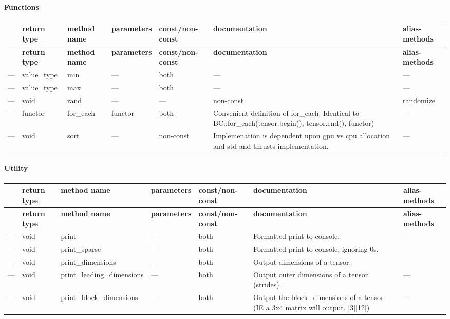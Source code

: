 \paragraph*{Functions}

\tabulinesep=1mm
\begin{longtabu} spread 0pt [c]{*7{|X[-1]}|}
\hline
{}&{\bf return type }&{\bf method name }&{\bf parameters }&{\bf const/non-\/const }&{\bf documentation }&{\bf alias-\/methods  }\\
\endfirsthead
\hline
\endfoot
\hline
{}&{\bf return type }&{\bf method name }&{\bf parameters }&{\bf const/non-\/const }&{\bf documentation }&{\bf alias-\/methods  }\\
\endhead
--- &value\+\_\+type &min &--- &both &--- &--- \\
--- &value\+\_\+type &max &--- &both &--- &--- \\
--- &void &rand &--- &--- &non-\/const &randomize \\
--- &functor &for\+\_\+each &functor &both &Convenient-\/definition of for\+\_\+each. Identical to B\+C\+::for\+\_\+each(tensor.\+begin(), tensor.\+end(), functor) &--- \\
--- &void &sort &--- &non-\/const &Implemenation is dependent upon gpu vs cpu allocation and std and thrust\textquotesingle{}s implementation. &--- \\
\end{longtabu}


\paragraph*{Utility}

\tabulinesep=1mm
\begin{longtabu} spread 0pt [c]{*7{|X[-1]}|}
\hline
{}&{\bf return type }&{\bf method name }&{\bf parameters }&{\bf const/non-\/const }&{\bf documentation }&{\bf alias-\/methods  }\\
\endfirsthead
\hline
\endfoot
\hline
{}&{\bf return type }&{\bf method name }&{\bf parameters }&{\bf const/non-\/const }&{\bf documentation }&{\bf alias-\/methods  }\\
\endhead
--- &void &print &--- &both &Formatted print to console. &--- \\
--- &void &print\+\_\+sparse &--- &both &Formatted print to console, ignoring 0\textquotesingle{}s. &--- \\
--- &void &print\+\_\+dimensions &--- &both &Output dimensions of a tensor. &--- \\
--- &void &print\+\_\+leading\+\_\+dimensions &--- &both &Output outer dimensions of a tensor (strides). &--- \\
--- &void &print\+\_\+block\+\_\+dimensions &--- &both &Output the block\+\_\+dimensions of a tensor (IE a 3x4 matrix will output. {\ttfamily \mbox{[}3\mbox{]}\mbox{[}12\mbox{]}}) &--- \\
\end{longtabu}
